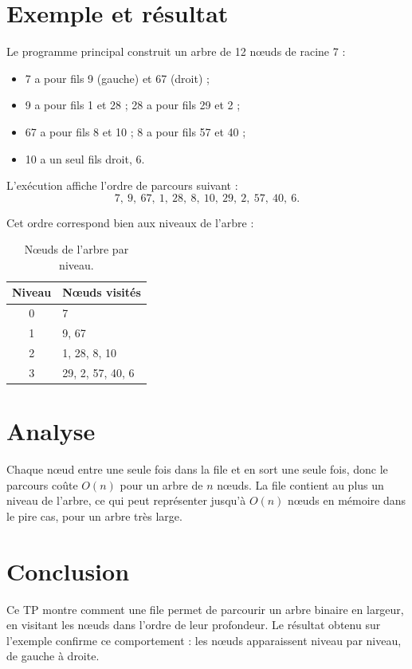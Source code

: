 \documentclass[12pt,a4paper]{article}
\begin{document}
\section{Exemple et résultat}
Le programme principal construit un arbre de 12 nœuds de racine 7 :
\begin{itemize}
  \item 7 a pour fils 9 (gauche) et 67 (droit) ;
  \item 9 a pour fils 1 et 28 ; 28 a pour fils 29 et 2 ;
  \item 67 a pour fils 8 et 10 ; 8 a pour fils 57 et 40 ;
  \item 10 a un seul fils droit, 6.
\end{itemize}

L'exécution affiche l'ordre de parcours suivant :
\[
  7,\ 9,\ 67,\ 1,\ 28,\ 8,\ 10,\ 29,\ 2,\ 57,\ 40,\ 6.
\]

Cet ordre correspond bien aux niveaux de l'arbre :

\begin{table}[h!]
\centering
\begin{tabular}{cl}
\toprule
\textbf{Niveau} & \textbf{Nœuds visités} \\
\midrule
0 & 7 \\
1 & 9, 67 \\
2 & 1, 28, 8, 10 \\
3 & 29, 2, 57, 40, 6 \\
\bottomrule
\end{tabular}
\caption{Nœuds de l'arbre par niveau.}
\end{table}

\section{Analyse}
Chaque nœud entre une seule fois dans la file et en sort une seule fois, donc
le parcours coûte $O(n)$ pour un arbre de $n$ nœuds. La file contient au plus
un niveau de l'arbre, ce qui peut représenter jusqu'à $O(n)$ nœuds en mémoire
dans le pire cas, pour un arbre très large.

\section{Conclusion}
Ce TP montre comment une file permet de parcourir un arbre binaire en largeur,
en visitant les nœuds dans l'ordre de leur profondeur. Le résultat obtenu sur
l'exemple confirme ce comportement : les nœuds apparaissent niveau par niveau,
de gauche à droite.
\end{document}
